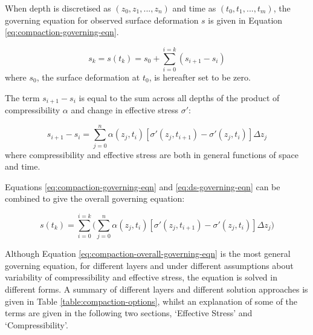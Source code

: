 \documentclass{article}
\begin{document}
When depth is discretised as $(z_0, z_1, ..., z_n)$ and time as $(t_0, t_1, ..., t_m)$, the governing equation for observed surface deformation $s$ is given in Equation \ref{eq:compaction-governing-eqn}.

\begin{equation}
s_k = s(t_k) = s_0 + \sum_{i=0}^{i=k} (s_{i+1} - s_i)
\label{eq:compaction-governing-eqn}
\end{equation}
where $s_0$, the surface deformation at $t_0$, is hereafter set to be zero.

The term $s_{i+1} - s_i$ is equal to the sum across all depths of the product of compressibility $\alpha$ and change in effective stress $\sigma'$:

\begin{equation}
s_{i+1} - s_i = \sum_{j=0}^{n} \alpha(z_j,t_i) [\sigma'(z_j,t_{i+1}) - \sigma'(z_j,t_i) ] \Delta z_j
\label{eq:ds-governing-eqn}
\end{equation}
where compressibility and effective stress are both in general functions of space and time.

Equations \ref{eq:compaction-governing-eqn} and \ref{eq:ds-governing-eqn} can be combined to give the overall governing equation:

\begin{equation}
s(t_k) = \sum_{i=0}^{i=k} \bigg(  \sum_{j=0}^{n} \alpha(z_j,t_i) [\sigma'(z_j,t_{i+1}) - \sigma'(z_j,t_i) ] \Delta z_j \bigg)
\label{eq:compaction-overall-governing-eqn}
\end{equation}

Although Equation \ref{eq:compaction-overall-governing-eqn} is the most general governing equation, for different layers and under different assumptions about variability of compressibility and effective stress, the equation is solved in different forms. A summary of different layers and different solution approaches is given in Table \ref{table:compaction-options}, whilst an explanation of some of the terms are given in the following two sections, `Effective Stress' and `Compressibility'.
\end{document}
